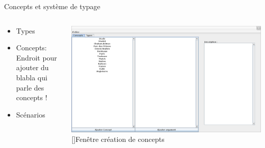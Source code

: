 \documentclass[8pt]{beamer}
\begin{document}
\begin{frame}{Concepts et système de typage}
\begin{columns}

\begin{column}{6cm}
\begin{itemize}
\item Types
\item Concepts:
\\ Endroit pour ajouter du blabla qui parle des concepts !
\item Scénarios
\end{itemize}
\end{column}

\begin{column}{6cm}
\includegraphics[scale=0.135]{creation_concepts.png}
[]{Fenêtre création de concepts}
\end{column}

\end{columns}
\end{frame}
\end{document}
